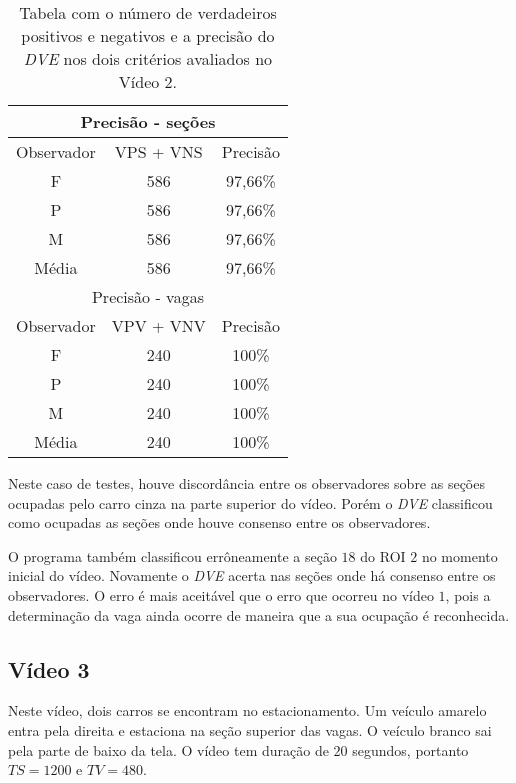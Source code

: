 \begin{table}[H]
\begin{center}
\begin{tabular}{|c||c||c|}
\hline
\multicolumn{3}{|c|}{Precisão - seções}  \\ \hline \hline
Observador & VPS + VNS & Precisão \\ \hline
F & 586 & 97,66\% \\  \hline
P & 586 & 97,66\% \\ \hline
M & 586 & 97,66\% \\ \hline
Média & 586 & 97,66\% \\
\hline
\hline
\multicolumn{3}{|c|}{Precisão - vagas}  \\ \hline \hline
Observador & VPV + VNV & Precisão \\ \hline
F & 240 & 100\% \\  \hline
P & 240 & 100\% \\ \hline
M & 240 & 100\% \\ \hline
Média & 240 & 100\% \\
\hline
\end{tabular}

\end{center}
\caption{Tabela com o número de verdadeiros positivos e negativos e a precisão  do \textit{DVE} nos dois critérios avaliados no Vídeo 2.}
\label{tab:rvideo2}
\end{table}




Neste caso de testes, houve discordância entre os observadores sobre as seções ocupadas pelo carro cinza na parte superior do vídeo. Porém o \textit{DVE} classificou como ocupadas as seções onde houve consenso entre os observadores.

O programa também classificou errôneamente a seção $18$ do ROI $2$ no momento inicial do vídeo. Novamente o \textit{DVE} acerta nas seções onde há consenso entre os observadores. O erro é mais aceitável que o erro que ocorreu no vídeo $1$, pois a determinação da vaga ainda ocorre de maneira que a sua ocupação é reconhecida.

\subsection{Vídeo 3}

Neste vídeo, dois carros se encontram no estacionamento. Um veículo amarelo entra pela direita e estaciona na seção superior das vagas. O veículo branco sai pela parte de baixo da tela. O vídeo tem duração de $20$ segundos, portanto $TS = 1200$ e $TV = 480$.

